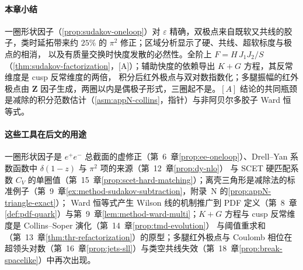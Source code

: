 \paragraph{本章小结}一圈形状因子（\cref{prop:sudakov-oneloop}）对 $\varepsilon$ 精确，双极点来自既软又共线的胶子，类时延拓带来约 $25\%$ 的 $\pi^2$ 修正；区域分析显示了硬、共线、超软标度与极点的相消，
以及有质量交换时快度发散的必然性。全阶上 $F=H\,J_1J_2/S$（\cref{thm:sudakov-factorization}，[A]）；辅助快度的依赖导出 $K+G$ 方程，其反常维度是 cusp 反常维度的两倍，
积分后红外极点与双对数指数化；多腿振幅的红外极点由 $\mathbf Z$ 因子生成，两圈以内是偶极子形式，三圈起不是。$[A]$ 结论的共同瓶颈是减除的积分范数估计（\cref{asm:appN-collins}，指针）与非阿贝尔多胶子 Ward 恒等式。

\paragraph{这些工具在后文的用途}一圈形状因子是 $e^+e^-$ 总截面的虚修正（第~6~章\cref{prop:ee-oneloop}）、Drell--Yan 系数函数中 $\delta(1-z)$ 与 $\pi^2$ 项的来源（第~12~章\cref{prop:dy-nlo}）
与 SCET 硬匹配系数 $C_V$ 的单圈值（第~15~章\cref{prop:scet-hard-matching}）；离壳三角形是减除法的标准例子（第~9~章\cref{ex:method-sudakov-subtraction}，附录~N 的\cref{prop:appN-triangle-exact}）；
Ward 恒等式产生 Wilson 线的机制推广到 PDF 定义（第~8~章\cref{def:pdf-quark}）与第~9~章\cref{lem:method-ward-multi}；$K+G$ 方程与 cusp 反常维度是 Collins--Soper 演化（第~14~章\cref{prop:tmd-evolution}）
与阈值重求和（第~13~章\cref{thm:thr-refactorization}）的原型；多腿红外极点与 Coulomb 相位在超领头对数（第~16~章\cref{prop:jets-sll}）与类空共线失效（第~18~章\cref{prop:break-spacelike}）中再次出现。
